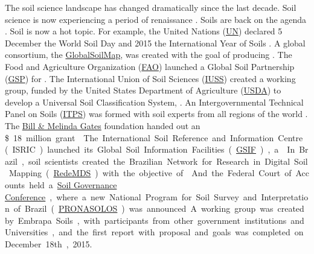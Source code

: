 The soil science landscape has changed dramatically since the last decade. Soil science is now
experiencing a period of renaissance \cite{HarteminkEtAl2008}. Soils are back on the agenda
\cite{Kempen2011}. Soil is now a hot topic. For example, the United Nations
(\href{http://www.un.org/apps/news/story.asp?NewsID=49520#.VnremV6alz0}{UN}) declared 5 December
the World Soil Day and 2015 the International Year of Soils . A global consortium, the
\href{http://www.globalsoilmap.net/}{GlobalSoilMap}, was created with the goal of producing
.
The Food and Agriculture Organization (\href{http://www.fao.org/index_en.htm}{FAO}) launched a
Global Soil Partnership (\href{http://www.fao.org/globalsoilpartnership/}{GSP}) for
. The International
Union of Soil Sciences (\href{http://www.iuss.org/index.php?article_id=525}{IUSS}) created a working group,
funded by the United States Department of Agriculture
(\href{http://www.nrcs.usda.gov/wps/portal/nrcs/main/soils/survey/class/}{USDA}) to develop a
Universal Soil Classification System, . An Intergovernmental Technical Panel on Soils
(\href{http://www.fao.org/globalsoilpartnership/intergovernmental-technical-panel-on-soils/}{ITPS})
was formed with soil experts from all regions of the world .
The \href{http://www.gatesfoundation.org/what-we-do/global-development/agricultural-development}{Bill
\& Melinda Gates} foundation handed out an \SI{18}[\$]~million grant . The International Soil
Reference and Information Centre (ISRIC) launched its Global Soil Information Facilities
(\href{http://www.isric.org/projects/global-soil-information-facilities-gsif}{GSIF}), a
. In Brazil, soil scientists created the
Brazilian Network for Research in Digital Soil Mapping (\href{https://goo.gl/m8QWUm}{RedeMDS}) with
the objective of . And the Federal Court of Accounts held a
\href{https://www.governancadosolo.gov.br/}{Soil Governance Conference}, where a new National
Program for Soil Survey and Interpretation of Brazil (\href{https://goo.gl/zbMK24}{PRONASOLOS}) was
announced. A working group was created by Embrapa Soils, with participants from other government institutions 
and Universities, and the first report with proposal and goals was completed on December 18th, 2015. 


